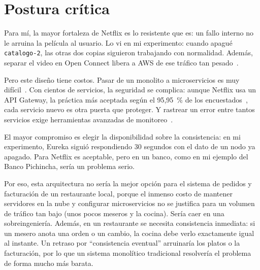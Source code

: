 \section{Postura crítica}

Para mí, la mayor fortaleza de Netflix es lo resistente que es: un fallo interno no le arruina la película al usuario. Lo vi en mi experimento: cuando apagué \texttt{catalogo-2}, las otras dos copias siguieron trabajando con normalidad. Además, separar el video en Open Connect libera a AWS de ese tráfico tan pesado~\cite{Netflix_OpenConnect}.

Pero este diseño tiene costos. Pasar de un monolito a microservicios es muy difícil~\cite{Abgaz_2023}. Con cientos de servicios, la seguridad se complica: aunque Netflix usa un API Gateway, la práctica más aceptada según el 95,95~\% de los encuestados~\cite{RezaeiNasab_2023}, cada servicio nuevo es otra puerta que proteger. Y rastrear un error entre tantos servicios exige herramientas avanzadas de monitoreo~\cite{Giamattei_2024,Gortney_2022}.

El mayor compromiso es elegir la disponibilidad sobre la consistencia: en mi experimento, Eureka siguió respondiendo 30 segundos con el dato de un nodo ya apagado. Para Netflix es aceptable, pero en un banco, como en mi ejemplo del Banco Pichincha, sería un problema serio.

Por eso, esta arquitectura no sería la mejor opción para el sistema de pedidos y facturación de un restaurante local, porque el inmenso costo de mantener servidores en la nube y configurar microservicios no se justifica para un volumen de tráfico tan bajo (unos pocos meseros y la cocina). Sería caer en una sobreingeniería. Además, en un restaurante se necesita consistencia inmediata: si un mesero anota una orden o un cambio, la cocina debe verlo exactamente igual al instante. Un retraso por \enquote{consistencia eventual} arruinaría los platos o la facturación, por lo que un sistema monolítico tradicional resolvería el problema de forma mucho más barata.
